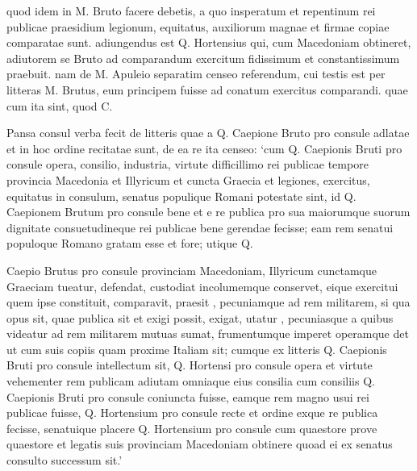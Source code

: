  quod idem in M. Bruto facere debetis, a quo insperatum et repentinum rei publicae praesidium legionum, equitatus, auxiliorum magnae et firmae copiae comparatae sunt. adiungendus est Q. Hortensius qui, cum Macedoniam obtineret, adiutorem se Bruto ad comparandum exercitum fidissimum et constantissimum praebuit. nam de M. Apuleio separatim censeo referendum, cui testis est per litteras M. Brutus, eum principem fuisse ad conatum exercitus comparandi. quae cum ita sint, quod C.

 Pansa consul verba fecit de litteris quae a Q. Caepione Bruto pro consule adlatae et in hoc ordine recitatae sunt, de ea re ita censeo: `cum Q. Caepionis Bruti pro consule opera, consilio, industria, virtute difficillimo rei publicae tempore provincia Macedonia et Illyricum et cuncta Graecia et legiones, exercitus, equitatus in consulum, senatus populique Romani potestate sint, id Q. Caepionem Brutum pro consule bene et e re publica pro sua maiorumque suorum dignitate consuetudineque rei publicae bene gerendae fecisse; eam rem senatui populoque Romano gratam esse et fore; utique Q.

 Caepio Brutus pro consule provinciam Macedoniam, Illyricum cunctamque Graeciam tueatur, defendat, custodiat incolumemque conservet, eique exercitui quem ipse constituit, comparavit, praesit , pecuniamque ad rem militarem, si qua opus sit, quae publica sit et exigi possit, exigat, utatur , pecuniasque a quibus videatur ad rem militarem mutuas sumat, frumentumque imperet operamque det ut cum suis copiis quam proxime Italiam sit; cumque ex litteris Q. Caepionis Bruti pro consule intellectum sit, Q. Hortensi pro consule opera et virtute vehementer rem publicam adiutam omniaque eius consilia cum consiliis Q. Caepionis Bruti pro consule coniuncta fuisse, eamque rem magno usui rei publicae fuisse, Q. Hortensium pro consule recte et ordine exque re publica fecisse, senatuique placere Q. Hortensium pro consule cum quaestore prove quaestore et legatis suis provinciam Macedoniam obtinere quoad ei ex senatus consulto successum sit.'
